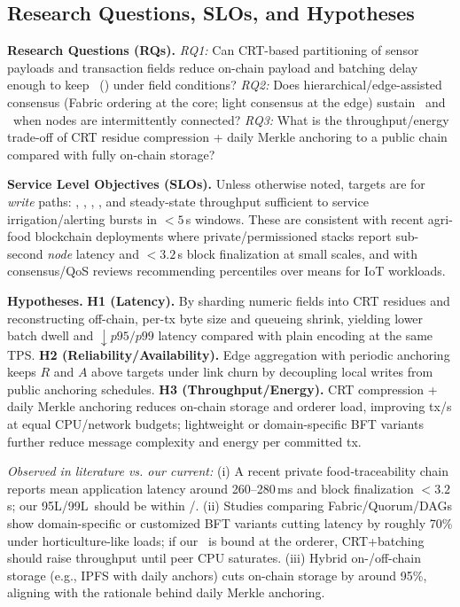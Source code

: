 \subsection{Research Questions, SLOs, and Hypotheses}
\label{sec:rqs-slos}
\textbf{Research Questions (RQs).}
\emph{RQ1:} Can CRT-based partitioning of sensor payloads and transaction fields reduce on-chain payload and batching delay enough to keep \SLOpL\ (\SLOpLnn) under field conditions? 
\emph{RQ2:} Does hierarchical/edge-assisted consensus (Fabric ordering at the core; light consensus at the edge) sustain \SLOR\ and \SLOA\ when nodes are intermittently connected? 
\emph{RQ3:} What is the throughput/energy trade-off of CRT residue compression + daily Merkle anchoring to a public chain compared with fully on-chain storage?

\textbf{Service Level Objectives (SLOs).}
Unless otherwise noted, targets are for \emph{write} paths: \SLOpL, \SLOpLnn, \SLOR, \SLOA, and steady-state throughput sufficient to service irrigation/alerting bursts in $<\!5$\,s windows.
These are consistent with recent agri-food blockchain deployments where private/permissioned stacks report sub-second \emph{node} latency and $<\!3.2$\,s block finalization at small scales, and with consensus/QoS reviews recommending percentiles over means for IoT workloads\cite{oh2025foodsafety,haque2024scalable}.

\textbf{Hypotheses.}
\textbf{H1 (Latency).} By sharding numeric fields into CRT residues and reconstructing off-chain, per-tx byte size and queueing shrink, yielding lower batch dwell and $\downarrow p95/p99$ latency compared with plain encoding at the same TPS. 
\textbf{H2 (Reliability/Availability).} Edge aggregation with periodic anchoring keeps $R$ and $A$ above targets under link churn by decoupling local writes from public anchoring schedules.
\textbf{H3 (Throughput/Energy).} CRT compression + daily Merkle anchoring reduces on-chain storage and orderer load, improving tx/s at equal CPU/network budgets; lightweight or domain-specific BFT variants further reduce message complexity and energy per committed tx\cite{haque2024scalable,coinspaid2023dag}.

\noindent\emph{Observed in literature vs. our current:}
(i) A recent private food‑traceability chain reports mean application latency around 260–280\,ms and block finalization $<\!3.2$\,s; our \CurrentP95L/\CurrentP99L\ should be within \SLOpL/\SLOpLnn\cite{oh2025foodsafety}. 
(ii) Studies comparing Fabric/Quorum/DAGs show domain-specific or customized BFT variants cutting latency by roughly 70\% under horticulture-like loads; if our \CurrentTPS\ is bound at the orderer, CRT+batching should raise throughput until peer CPU saturates\cite{haque2024scalable}. 
(iii) Hybrid on-/off-chain storage (e.g., IPFS with daily anchors) cuts on-chain storage by around 95\%, aligning with the rationale behind daily Merkle anchoring\cite{haque2024scalable}.

